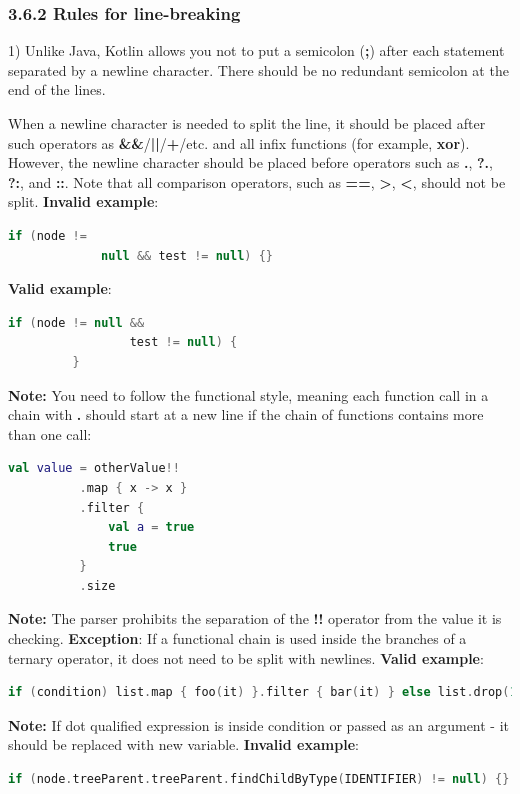 \subsubsection*{\textbf{3.6.2 Rules for line-breaking}}
\leavevmode\newline
\label{sec:3.6.2}
1) Unlike Java, Kotlin allows you not to put a semicolon (\textbf{;}) after each statement separated by a newline character.
    There should be no redundant semicolon at the end of the lines.

When a newline character is needed to split the line, it should be placed after such operators as \textbf{\&\&}/\textbf{||}/\textbf{+}/etc. and all infix functions (for example, \textbf{xor}).
However, the newline character should be placed before operators such as \textbf{.}, \textbf{?.}, \textbf{?:}, and \textbf{::}.
Note that all comparison operators, such as \textbf{==}, \textbf{>}, \textbf{<}, should not be split.
\textbf{Invalid example}:
\begin{lstlisting}[language=Kotlin]
     if (node !=
             null && test != null) {}
\end{lstlisting}

\textbf{Valid example}:
\begin{lstlisting}[language=Kotlin]
         if (node != null &&
                 test != null) {
         }
\end{lstlisting}

\textbf{Note:} You need to follow the functional style, meaning each function call in a chain with \textbf{.} should start at a new line if the chain of functions contains more than one call:
\begin{lstlisting}[language=Kotlin]
  val value = otherValue!!
          .map { x -> x }
          .filter {
              val a = true
              true
          }
          .size
\end{lstlisting}
\textbf{Note:} The parser prohibits the separation of the \textbf{!!} operator from the value it is checking.
\textbf{Exception}: If a functional chain is used inside the branches of a ternary operator, it does not need to be split with newlines.
\textbf{Valid example}:
\begin{lstlisting}[language=Kotlin]
if (condition) list.map { foo(it) }.filter { bar(it) } else list.drop(1)
\end{lstlisting}
\textbf{Note:} If dot qualified expression is inside condition or passed as an argument - it should be replaced with new variable.
\textbf{Invalid example}:
\begin{lstlisting}[language=Kotlin]
 if (node.treeParent.treeParent.findChildByType(IDENTIFIER) != null) {}
\end{lstlisting}

